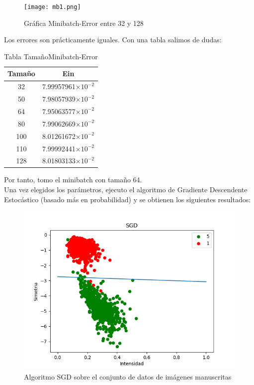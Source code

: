 \begin{figure}[H] %
	\centering
	\texttt{[image: mb1.png]}  %
	\caption{Gráfica Minibatch-Error entre 32 y 128} 
	\label{fig:mb}
\end{figure}

Los errores son prácticamente iguales. Con una tabla salimos de dudas:

\begin{table}[H]
	\centering
	\begin{tabular}{|c|c|}
		\hline
		Tamaño & Ein            \\ \hline
		32     & 7.99957961$\times 10^{-2}$ \\ \hline
		50     & 7.98057939$\times 10^{-2}$ \\ \hline
		64     & 7.95063577$\times 10^{-2}$ \\ \hline
		80     & 7.99062669$\times 10^{-2}$ \\ \hline
		100    & 8.01261672$\times 10^{-2}$ \\ \hline
		110    & 7.99992441$\times 10^{-2}$ \\ \hline
		128    & 8.01803133$\times 10^{-2}$ \\ \hline
	\end{tabular}
	\caption{Tabla TamañoMinibatch-Error}
	\label{table2}
\end{table}

Por tanto, tomo el minibatch con tamaño 64.\\

Una vez elegidos los parámetros, ejecuto el algoritmo de Gradiente Descendente Estocástico (basado más en probabilidad) y se obtienen los siguientes resultados:

\begin{figure}[H] %
	\centering
	\includegraphics[scale=0.6]{sgd.png}  %
	\caption{Algoritmo SGD sobre el conjunto de datos de imágenes manuscritas} 
	\label{fig:sgd}
\end{figure}

